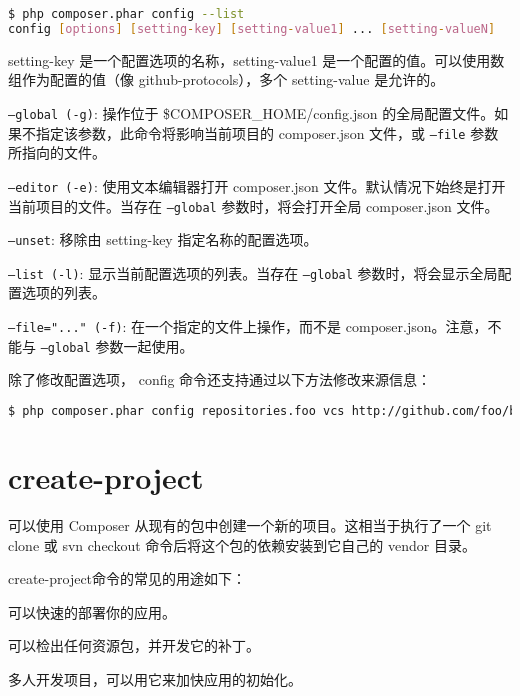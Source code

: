 \begin{lstlisting}[language=bash]
$ php composer.phar config --list
config [options] [setting-key] [setting-value1] ... [setting-valueN]
\end{lstlisting}

setting-key 是一个配置选项的名称，setting-value1 是一个配置的值。可以使用数组作为配置的值（像 github-protocols），多个 setting-value 是允许的。

\begin{compactitem}
\item \texttt{--global (-g)}: 操作位于 \$COMPOSER\_HOME/config.json 的全局配置文件。如果不指定该参数，此命令将影响当前项目的 composer.json 文件，或 \texttt{--file} 参数所指向的文件。
\item \texttt{--editor (-e)}: 使用文本编辑器打开 composer.json 文件。默认情况下始终是打开当前项目的文件。当存在 \texttt{--global} 参数时，将会打开全局 composer.json 文件。
\item \texttt{--unset}: 移除由 setting-key 指定名称的配置选项。
\item \texttt{--list (-l)}: 显示当前配置选项的列表。当存在 \texttt{--global} 参数时，将会显示全局配置选项的列表。
\item \texttt{--file="..." (-f)}: 在一个指定的文件上操作，而不是 composer.json。注意，不能与 \texttt{--global} 参数一起使用。
\end{compactitem}

除了修改配置选项， config 命令还支持通过以下方法修改来源信息：


\begin{lstlisting}[language=bash]
$ php composer.phar config repositories.foo vcs http://github.com/foo/bar
\end{lstlisting}

\section{create-project}

可以使用 Composer 从现有的包中创建一个新的项目。这相当于执行了一个 git clone 或 svn checkout 命令后将这个包的依赖安装到它自己的 vendor 目录。


create-project命令的常见的用途如下：

\begin{compactitem}
\item 可以快速的部署你的应用。
\item 可以检出任何资源包，并开发它的补丁。
\item 多人开发项目，可以用它来加快应用的初始化。
\end{compactitem}

